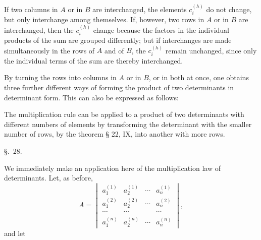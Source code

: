 
If two columns in $A$ or in $B$ are interchanged, the elements $c_i^{(h)}$ do not change, but only interchange among themselves. If, however, two rows in $A$ or in $B$ are interchanged, then the $c_i^{(h)}$ change because the factors in the individual products of the sum are grouped differently; but if  interchanges are made simultaneously in the rows of $A$ and of $B$, the $c_i^{(h)}$ remain unchanged, since only the individual terms of the sum are thereby interchanged.

By turning the rows into columns in $A$ or in $B$, or in both at once, one obtains three further different ways of forming the product of two determinants in determinant form. This can also be expressed as follows: 

The multiplication rule can be applied to a product of two determinants with different numbers of elements by transforming the determinant with the smaller number of rows, by the theorem § 22, IX, into another with more rows.

\begin{center}
{\large \S.\ 28.}

\vspace{0.5em}
{\large{}}
\end{center}

We immediately make an application here of the multiplication law of determinants. Let, as before,
\[
A=\begin{vmatrix}
 a_1^{(1)}&a_2^{(1)}&\cdots&a_n^{(1)}\\
 a_1^{(2)}&a_2^{(2)}&\cdots&a_n^{(2)}\\
 \cdots&\cdots&&\cdots\\
 a_1^{(n)}&a_2^{(n)}&\cdots&a_n^{(n)}
\end{vmatrix},\tag{1}
\]
and let
